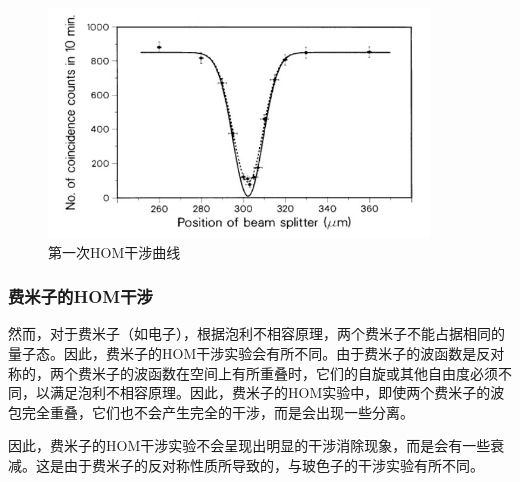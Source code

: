 \documentclass[a4paper,UTF8]{ctexart}
\begin{document}
\begin{figure}[H]
    \centering
    \begin{minipage}[b]{0.9\textwidth}
        \centering
        \includegraphics[width=0.9\textwidth]{./fig3.jpg}
        \caption{第一次HOM干涉曲线}
    \end{minipage}
\end{figure}

\subsubsection{费米子的HOM干涉}

然而，对于费米子（如电子），根据泡利不相容原理，两个费米子不能占据相同的量子态。因此，费米子的HOM干涉实验会有所不同。由于费米子的波函数是反对称的，两个费米子的波函数在空间上有所重叠时，它们的自旋或其他自由度必须不同，以满足泡利不相容原理。因此，费米子的HOM实验中，即使两个费米子的波包完全重叠，它们也不会产生完全的干涉，而是会出现一些分离。

因此，费米子的HOM干涉实验不会呈现出明显的干涉消除现象，而是会有一些衰减。这是由于费米子的反对称性质所导致的，与玻色子的干涉实验有所不同。
\end{document}
